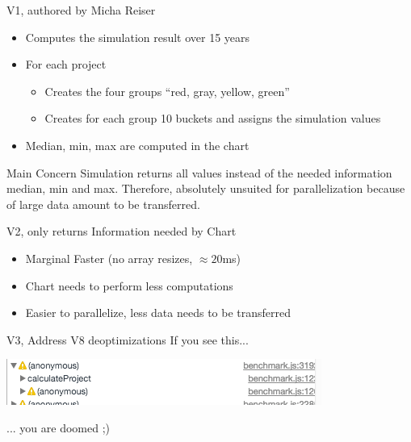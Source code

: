 \begin{frame}{V1, authored by Micha Reiser}
	\begin{itemize}
		\item Computes the simulation result over 15 years
		\item For each project
		\begin{itemize}
			\item Creates the four groups \enquote{red, gray, yellow, green}
			\item Creates for each group 10 buckets and assigns the simulation values
		\end{itemize}
		\item Median, min, max are computed in the chart
	\end{itemize}
	
	\vfill
	\begin{alertblock}{Main Concern}
		Simulation returns all values instead of the needed information median, min and max. Therefore, absolutely unsuited for parallelization because of large data amount to be transferred.
	\end{alertblock}

\end{frame}

\begin{frame}{V2, only returns Information needed by Chart}
	\begin{itemize}
		\item Marginal Faster (no array resizes, $\approx 20$ms)
		\item Chart needs to perform less computations
		\item Easier to parallelize, less data needs to be transferred
	\end{itemize}
\end{frame}

\begin{frame}{V3, Address V8 deoptimizations}
	If you see this...
	
	\includegraphics[scale=0.45]{deopt}
	
	... you are doomed ;)
\end{frame}

